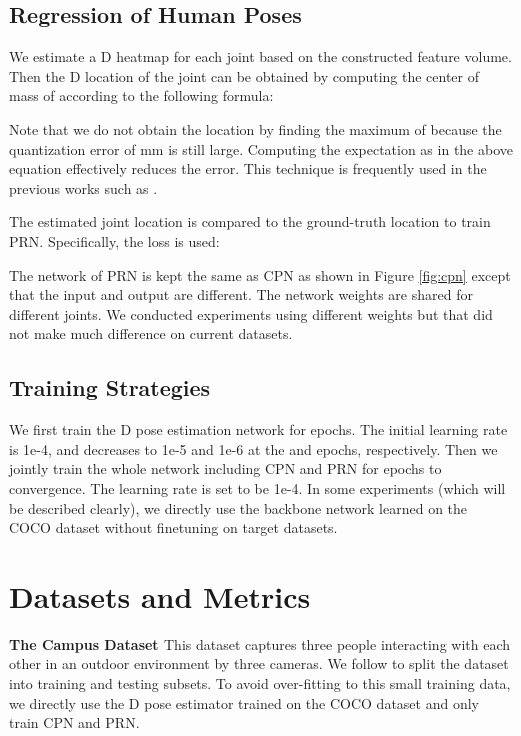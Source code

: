 \documentclass[runningheads]{llncs}
\begin{document}
\subsection{Regression of Human Poses}
We estimate a D heatmap  for each joint  based on the constructed feature volume.  Then the D location  of the joint can be obtained by computing the center of mass of  according to the following formula:

Note that we do not obtain the location  by finding the maximum of  because the quantization error of mm is still large. Computing the expectation as in the above equation effectively reduces the error. This technique is frequently used in the previous works such as \cite{sun2018integral}.

The estimated joint location is compared to the ground-truth location  to train PRN. Specifically, the  loss is used:


The network of PRN is kept the same as CPN as shown in Figure \ref{fig:cpn} except that the input and output are different. The network weights are shared for different joints. We conducted experiments using different weights but that did not make much difference on current datasets. 

\subsection{Training Strategies}
We first train the D pose estimation network for  epochs. The initial learning rate is 1e-4, and decreases to 1e-5 and 1e-6 at the  and  epochs, respectively. Then we jointly train the whole network including CPN and PRN for  epochs to convergence. The learning rate is set to be 1e-4. In some experiments (which will be described clearly), we directly use the backbone network learned on the COCO dataset without finetuning on target datasets.

\section{Datasets and Metrics}
\label{sec:datasets}
\textbf{The Campus Dataset \cite{belagiannis20143d}}
This dataset captures three people interacting with each other in an outdoor environment by three cameras. We follow \cite{belagiannis20143d,dong2019fast} to split the dataset into training and testing subsets. To avoid over-fitting to this small training data, we directly use the D pose estimator trained on the COCO dataset and only train CPN and PRN.
\end{document}
